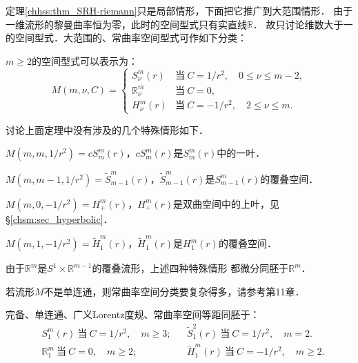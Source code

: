 定理\ref{chhss:thm_SRH-riemann}只是局部情形，下面把它推广到大范围情形．
由于一维流形的黎曼曲率恒为零，此时的空间型式只有实直线$\mathbb{R}$．
故只讨论维数大于一的空间型式．大范围的、常曲率空间型式可作如下分类：

\begin{theorem}\label{chhss:thm_SFM}
    $m\geqslant 2$的空间型式可以表示为：
    \begin{equation}\label{chhss:eqn_SFM}
        M(m,\nu,C)=\begin{cases}
            S^m_\nu(r) & \text{当}\  C=1/r^2,\quad  0\leqslant \nu \leqslant m-2 , \\
            \mathbb{R}^m_\nu & \text{当}\  C=0, \\
            H^m_\nu(r) & \text{当}\  C=-1/r^2,\quad 2\leqslant \nu \leqslant m .
        \end{cases}
    \end{equation}
\end{theorem}

讨论上面定理中没有涉及的几个特殊情形如下．

$M(m,m,1/r^2)=cS^m_m(r)$，$cS^m_m(r)$是$S^m_m(r)$中的一叶．

$M(m,m-1,1/r^2)=\widetilde{S}^m_{m-1}(r)$，$\widetilde{S}^m_{m-1}(r)$是$S^m_{m-1}(r)$的覆叠空间．

$M(m,0,-1/r^2)=H^m_+(r)$，$H^m_+(r)$是双曲空间中的上叶，见\S\ref{chsm:sec_hyperbolic}．

$M(m,1,-1/r^2)=\widetilde{H}^m_1(r)$，$\widetilde{H}^m_{1}(r)$是$H^m_{1}(r)$的覆叠空间．

由于$\mathbb{R}^m$是$S^1\times \mathbb{R}^{m-1}$的覆叠流形，上述四种特殊情形
都微分同胚于$\mathbb{R}^m$．

若流形$M$不是单连通，则常曲率空间分类要复杂得多，请参考\parencite{wolf_SCC-2011}第11章．



\begin{theorem}\label{chhss:thm_Lorentz-SF}
    完备、单连通、广义Lorentz度规、常曲率空间等距同胚于：
    \begin{align*}
        & S^m_1(r)\  \text{当}\  C=1/r^2,\quad  m\geqslant 3 ; &
        &\widetilde{S}^2_1(r)\  \text{当}\  C=1/r^2,\quad  m=2 . \\
        &\mathbb{R}^m_1 \ \text{当}\  C=0,\quad  m \geqslant 2 ; &
        &\widetilde{H}^m_1(r) \ \text{当}\  C=-1/r^2,\quad  m\geqslant2 . 
    \end{align*}
\end{theorem}

